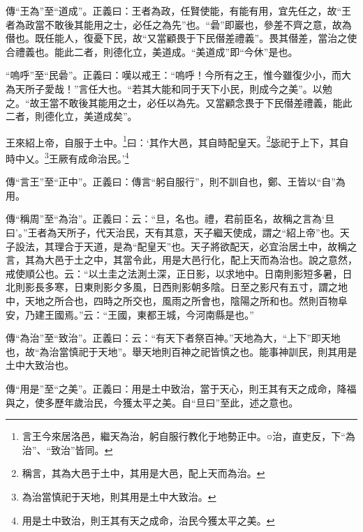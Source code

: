 {\noindent\zhuan{}\fzbyks 傳“王為”至“道成”。正義曰：王者為政，任賢使能，有能有用，宜先任之，故“王者為政當不敢後其能用之士，必任之為先”也。“碞”即巖也，參差不齊之意，故為僣也。既任能人，復憂下民，故“又當顧畏于下民僣差禮義”。畏其僣差，當治之使合禮義也。能此二者，則德化立，美道成。“美道成”即“今休”是也。 \par}

{\noindent\shu{}\fzkt “嗚呼”至“民碞”。正義曰：嘆以戒王：“嗚呼！今所有之王，惟今雖復少小，而大為天所子愛哉！”言任大也。“若其大能和同于天下小民，則成今之美”。以勉之。“故王當不敢後其能用之士，必任以為先。又當顧念畏于下民僣差禮義，能此二者，則德化立，美道成矣”。 \par}

王來紹上帝，自服于土中。\footnote{言王今來居洛邑，繼天為治，躬自服行教化于地勢正中。○治，直吏反，下“為治”、“致治”皆同。}曰：‘其作大邑，其自時配皇天。\footnote{稱言，其為大邑于土中，其用是大邑，配上天而為治。}毖祀于上下，其自時中乂。\footnote{為治當慎祀于天地，則其用是土中大致治。}王厥有成命治民。’\footnote{用是土中致治，則王其有天之成命，治民今獲太平之美。}


{\noindent\zhuan{}\fzbyks 傳“言王”至“正中”。正義曰：傳言“躬自服行”，則不訓自也，鄭、王皆以“自”為用。 \par}

{\noindent\zhuan{}\fzbyks 傳“稱周”至“為治”。正義曰：云：“旦，名也。禮，君前臣名，故稱之言為‘旦曰’。”王者為天所子，代天治民，天有其意，天子繼天使成，謂之“紹上帝”也。天子設法，其理合于天道，是為“配皇天”也。天子將欲配天，必宜治居土中，故稱之言，其為大邑于土之中，其當令此，用是大邑行化，配上天而為治也。說之意然，戒使順公也。云：“以土圭之法測土深，正日影，以求地中。日南則影短多暑，日北則影長多寒，日東則影夕多風，日西則影朝多陰。日至之影尺有五寸，謂之地中，天地之所合也，四時之所交也，風雨之所會也，陰陽之所和也。然則百物阜安，乃建王國焉。”云：“王國，東都王城，今河南縣是也。” \par}

{\noindent\zhuan{}\fzbyks 傳“為治”至“致治”。正義曰：云：“有天下者祭百神。”天地為大，“上下”即天地也，故“為治當慎祀于天地”。舉天地則百神之祀皆慎之也。能事神訓民，則其用是土中大致治也。 \par}

{\noindent\zhuan{}\fzbyks 傳“用是”至“之美”。正義曰：用是土中致治，當于天心，則王其有天之成命，降福與之，使多歷年歲治民，今獲太平之美。自“旦曰”至此，述之意也。 \par}

